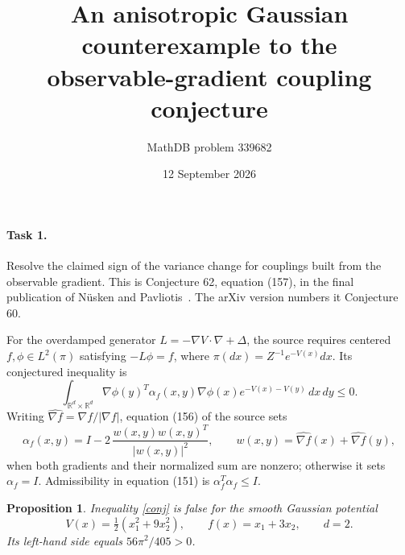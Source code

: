 \documentclass[10pt]{article}
\title{An anisotropic Gaussian counterexample to the\\observable-gradient coupling conjecture}
\author{MathDB problem 339682}
\date{12 September 2026}
\newtheorem{proposition}{Proposition}
\newcommand{\R}{\mathbb R}
\begin{document}
\maketitle

\paragraph{Task 1.} Resolve the claimed sign of the variance change for
couplings built from the observable gradient. This is Conjecture 62,
equation (157), in the final publication of N\"usken and Pavliotis~\cite{NP}.
The arXiv version numbers it Conjecture 60.

For the overdamped generator \(L=-\nabla V\cdot\nabla+\Delta\), the source
requires centered \(f,\phi\in L^2(\pi)\) satisfying \(-L\phi=f\), where
\(\pi(dx)=Z^{-1}e^{-V(x)}dx\). Its conjectured inequality is
\begin{equation}\label{conj}
 \int_{\R^d\times\R^d}
 \nabla\phi(y)^T\alpha_f(x,y)\nabla\phi(x)
 e^{-V(x)-V(y)}\,dx\,dy\leq0.
\end{equation}
Writing \(\widehat{\nabla f}=\nabla f/|\nabla f|\), equation (156) of the source
sets
\[
 \alpha_f(x,y)=I-2\,\frac{w(x,y)w(x,y)^T}{|w(x,y)|^2},
 \qquad w(x,y)=\widehat{\nabla f}(x)+\widehat{\nabla f}(y),
\]
when both gradients and their normalized sum are nonzero; otherwise it sets
\(\alpha_f=I\). Admissibility in equation (151) is
\(\alpha_f^T\alpha_f\leq I\).

\begin{proposition}
Inequality \eqref{conj} is false for the smooth Gaussian potential
\[
 V(x)=\tfrac12(x_1^2+9x_2^2),\qquad f(x)=x_1+3x_2,\qquad d=2.
\]
Its left-hand side equals \(56\pi^2/405>0\).
\end{proposition}
\end{document}
